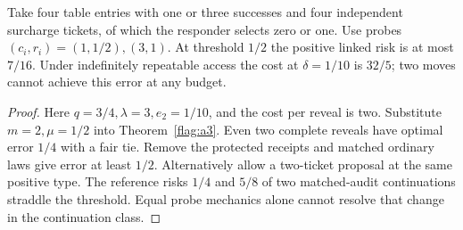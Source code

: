 \begin{proposition}\label{flag:a4}
Take four table entries with one or three successes and four independent surcharge tickets, of which the responder selects zero or one. Use probes \((c_i,r_i)=(1,1/2),(3,1)\). At threshold \(1/2\) the positive linked risk is at most \(7/16\). Under indefinitely repeatable access the cost at \(\delta=1/10\) is \(32/5\); two moves cannot achieve this error at any budget.
\end{proposition}
\begin{proof}
Here \(q=3/4,\lambda=3,e_2=1/10\), and the cost per reveal is two. Substitute \(m=2,\mu=1/2\) into Theorem~\ref{flag:a3}. Even two complete reveals have optimal error \(1/4\) with a fair tie. Remove the protected receipts and matched ordinary laws give error at least \(1/2\). Alternatively allow a two-ticket proposal at the same positive type. The reference risks \(1/4\) and \(5/8\) of two matched-audit continuations straddle the threshold. Equal probe mechanics alone cannot resolve that change in the continuation class.
\end{proof}

